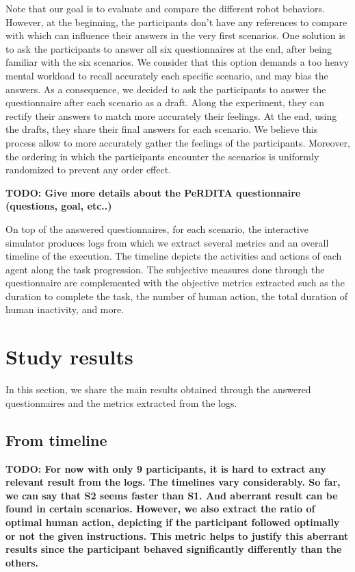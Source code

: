 Note that our goal is to evaluate and compare the different robot behaviors. However, at the beginning, the participants don't have any references to compare with which can influence their answers in the very first scenarios. One solution is to ask the participants to answer all six questionnaires at the end, after being familiar with the six scenarios. We consider that this option demands a too heavy mental workload to recall accurately each specific scenario, and may bias the answers. As a consequence, we decided to ask the participants to answer the questionnaire after each scenario as a draft. Along the experiment, they can rectify their answers to match more accurately their feelings. At the end, using the drafts, they share their final answers for each scenario. We believe this process allow to more accurately gather the feelings of the participants. Moreover, the ordering in which the participants encounter the scenarios is uniformly randomized to prevent any order effect. 

\textbf{TODO: Give more details about the PeRDITA questionnaire (questions, goal, etc..)}

On top of the answered questionnaires, for each scenario, the interactive simulator produces logs from which we extract several metrics and an overall timeline of the execution. The timeline depicts the activities and actions of each agent along the task progression. The subjective measures done through the questionnaire are complemented with the objective metrics extracted such as the duration to complete the task, the number of human action, the total duration of human inactivity, and more. 



\section{Study results}

In this section, we share the main results obtained through the answered questionnaires and the metrics extracted from the logs.



\subsection{From timeline}
\textbf{TODO: For now with only 9 participants, it is hard to extract any relevant result from the logs. The timelines vary considerably. So far, we can say that S2 seems faster than S1. And aberrant result can be found in certain scenarios. However, we also extract the ratio of optimal human action, depicting if the participant followed optimally or not the given instructions. This metric helps to justify this aberrant results since the participant behaved significantly differently than the others.}

